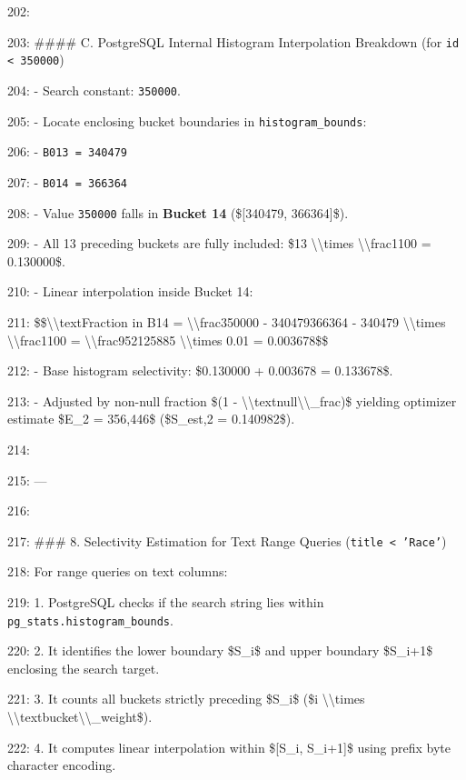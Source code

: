 \documentclass[11pt,a4paper]{article}
\begin{document}
202:

203: \#\#\#\# C. PostgreSQL Internal Histogram Interpolation Breakdown (for \texttt{id < 350000})

204: - Search constant: \texttt{350000}.

205: - Locate enclosing bucket boundaries in \texttt{histogram\_bounds}:

206:   - \texttt{B013 = 340479}

207:   - \texttt{B014 = 366364}

208: - Value \texttt{350000} falls in \textbf{Bucket 14} (\$[340479, 366364]\$).

209: - All 13 preceding buckets are fully included: \$13 \textbackslash{}\textbackslash{}times \textbackslash{}\textbackslash{}frac{{1}}{{100}} = 0.130000\$.

210: - Linear interpolation inside Bucket 14:

211:   \$\$\textbackslash{}\textbackslash{}text{{Fraction in B14}} = \textbackslash{}\textbackslash{}frac{{350000 - 340479}}{{366364 - 340479}} \textbackslash{}\textbackslash{}times \textbackslash{}\textbackslash{}frac{{1}}{{100}} = \textbackslash{}\textbackslash{}frac{{9521}}{{25885}} \textbackslash{}\textbackslash{}times 0.01 = 0.003678\$\$

212: - Base histogram selectivity: \$0.130000 + 0.003678 = 0.133678\$.

213: - Adjusted by non-null fraction \$(1 - \textbackslash{}\textbackslash{}text{{null\textbackslash{}\textbackslash{}\_frac}})\$ yielding optimizer estimate \$E\_2 = 356,446\$ (\$S\_{{est,2}} = 0.140982\$).

214:

215: ---

216:

217: \#\#\# 8. Selectivity Estimation for Text Range Queries (\texttt{title < 'Race'})

218: For range queries on text columns:

219: 1. PostgreSQL checks if the search string lies within \texttt{pg\_stats.histogram\_bounds}.

220: 2. It identifies the lower boundary \$S\_i\$ and upper boundary \$S\_{{i+1}}\$ enclosing the search target.

221: 3. It counts all buckets strictly preceding \$S\_i\$ (\$i \textbackslash{}\textbackslash{}times \textbackslash{}\textbackslash{}text{{bucket\textbackslash{}\textbackslash{}\_weight}}\$).

222: 4. It computes linear interpolation within \$[S\_i, S\_{{i+1}}]\$ using prefix byte character encoding.
\end{document}

